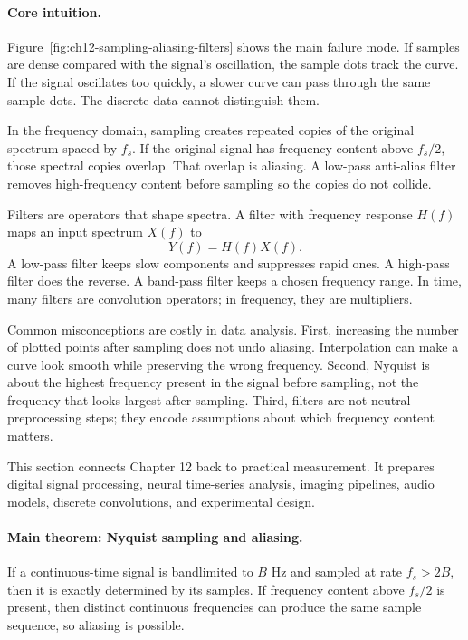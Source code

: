\paragraph{Core intuition.}
Figure~\ref{fig:ch12-sampling-aliasing-filters} shows the main failure mode. If samples are dense compared with the signal's oscillation, the sample dots track the curve. If the signal oscillates too quickly, a slower curve can pass through the same sample dots. The discrete data cannot distinguish them.

In the frequency domain, sampling creates repeated copies of the original spectrum spaced by \(f_s\). If the original signal has frequency content above \(f_s/2\), those spectral copies overlap. That overlap is aliasing. A low-pass anti-alias filter removes high-frequency content before sampling so the copies do not collide.

Filters are operators that shape spectra. A filter with frequency response \(H(f)\) maps an input spectrum \(X(f)\) to
\[
Y(f)=H(f)X(f).
\]
A low-pass filter keeps slow components and suppresses rapid ones. A high-pass filter does the reverse. A band-pass filter keeps a chosen frequency range. In time, many filters are convolution operators; in frequency, they are multipliers.

Common misconceptions are costly in data analysis. First, increasing the number of plotted points after sampling does not undo aliasing. Interpolation can make a curve look smooth while preserving the wrong frequency. Second, Nyquist is about the highest frequency present in the signal before sampling, not the frequency that looks largest after sampling. Third, filters are not neutral preprocessing steps; they encode assumptions about which frequency content matters.

This section connects Chapter 12 back to practical measurement. It prepares digital signal processing, neural time-series analysis, imaging pipelines, audio models, discrete convolutions, and experimental design.

\paragraph{Main theorem: Nyquist sampling and aliasing.}
If a continuous-time signal is bandlimited to \(B\) Hz and sampled at rate \(f_s>2B\), then it is exactly determined by its samples. If frequency content above \(f_s/2\) is present, then distinct continuous frequencies can produce the same sample sequence, so aliasing is possible.

